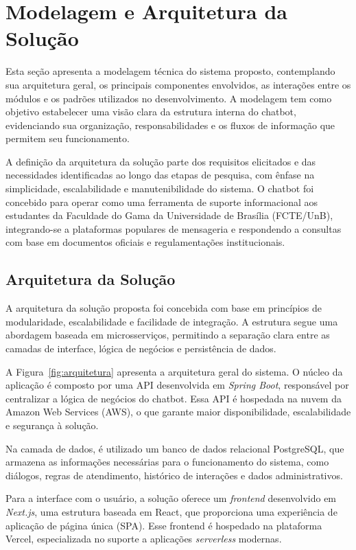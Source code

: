 \section{Modelagem e Arquitetura da Solução}

Esta seção apresenta a modelagem técnica do sistema proposto, contemplando sua arquitetura geral, os principais componentes envolvidos, as interações entre os módulos e os padrões utilizados no desenvolvimento. A modelagem tem como objetivo estabelecer uma visão clara da estrutura interna do chatbot, evidenciando sua organização, responsabilidades e os fluxos de informação que permitem seu funcionamento.

A definição da arquitetura da solução parte dos requisitos elicitados e das necessidades identificadas ao longo das etapas de pesquisa, com ênfase na simplicidade, escalabilidade e manutenibilidade do sistema. O chatbot foi concebido para operar como uma ferramenta de suporte informacional aos estudantes da Faculdade do Gama da Universidade de Brasília (FCTE/UnB), integrando-se a plataformas populares de mensageria e respondendo a consultas com base em documentos oficiais e regulamentações institucionais.

\subsection{Arquitetura da Solução}

A arquitetura da solução proposta foi concebida com base em princípios de modularidade, escalabilidade e facilidade de integração. A estrutura segue uma abordagem baseada em microsserviços, permitindo a separação clara entre as camadas de interface, lógica de negócios e persistência de dados.

A Figura~\ref{fig:arquitetura} apresenta a arquitetura geral do sistema. O núcleo da aplicação é composto por uma API desenvolvida em \textit{Spring Boot}, responsável por centralizar a lógica de negócios do chatbot. Essa API é hospedada na nuvem da Amazon Web Services (AWS), o que garante maior disponibilidade, escalabilidade e segurança à solução.

Na camada de dados, é utilizado um banco de dados relacional PostgreSQL, que armazena as informações necessárias para o funcionamento do sistema, como diálogos, regras de atendimento, histórico de interações e dados administrativos.

Para a interface com o usuário, a solução oferece um \textit{frontend} desenvolvido em \textit{Next.js}, uma estrutura baseada em React, que proporciona uma experiência de aplicação de página única (SPA). Esse frontend é hospedado na plataforma Vercel, especializada no suporte a aplicações \textit{serverless} modernas.

